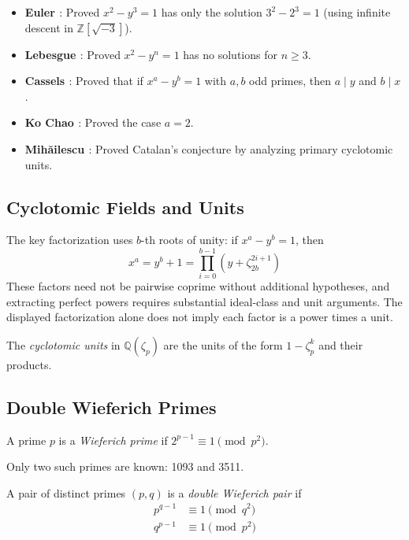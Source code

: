 \begin{itemize}
\item \textbf{Euler \cite{euler1783}}: Proved $x^2 - y^3 = 1$ has only the solution $3^2 - 2^3 = 1$ (using infinite descent in $\mathbb{Z}[\sqrt{-3}]$).
\item \textbf{Lebesgue \cite{lebesgue1850}}: Proved $x^2 - y^n = 1$ has no solutions for $n \geq 3$.
\item \textbf{Cassels \cite{cassels1960}}: Proved that if $x^a - y^b = 1$ with $a, b$ odd primes, then $a \mid y$ and $b \mid x$.
\item \textbf{Ko Chao \cite{kochao1965}}: Proved the case $a = 2$.
\item \textbf{Mihăilescu \cite{mihailescu2004}}: Proved Catalan's conjecture by analyzing primary cyclotomic units.
\end{itemize}

\subsection{Cyclotomic Fields and Units}

The key factorization uses $b$-th roots of unity: if $x^a-y^b=1$, then
\begin{equation}
x^a = y^b+1 = \prod_{i=0}^{b-1}(y+\zeta_{2b}^{2i+1})
\end{equation}
These factors need not be pairwise coprime without additional hypotheses, and extracting perfect powers requires substantial ideal-class and unit arguments. The displayed factorization alone does not imply each factor is a power times a unit.

\begin{definition}
The \emph{cyclotomic units} in $\mathbb{Q}(\zeta_p)$ are the units of the form $1 - \zeta_p^k$ and their products.
\end{definition}

\subsection{Double Wieferich Primes}

\begin{definition}
A prime $p$ is a \emph{Wieferich prime} if $2^{p-1} \equiv 1 \pmod{p^2}$.
\end{definition}

Only two such primes are known: 1093 and 3511.

\begin{definition}
A pair of distinct primes $(p, q)$ is a \emph{double Wieferich pair} if
\begin{align}
p^{q-1} &\equiv 1 \pmod{q^2} \\
q^{p-1} &\equiv 1 \pmod{p^2}
\end{align}
\end{definition}

